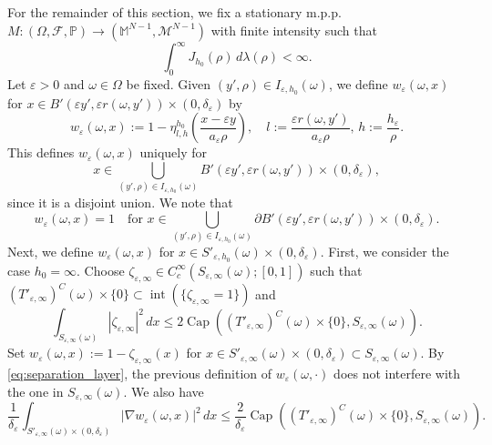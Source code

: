 \documentclass{article}
\numberwithin{equation}{section}
\theoremstyle{definition}
\theoremstyle{remark}
\newcommand{\cpct}{\operatorname{Cap}}
\newcommand{\topint}{\operatorname{int}}
\begin{document}
For the remainder of this section, we fix a stationary m.p.p. $M :(\Omega, \mathcal{F}, \mathbb{P}) \rightarrow (\mathbb{M}^{N - 1}, \mathcal{M}^{N - 1})$ with finite intensity such that
\[
\int_0^\infty J_{h_0}(\rho) \, d\lambda(\rho) < \infty.
\]
Let $\varepsilon > 0$ and $\omega \in \Omega$ be fixed. Given $(y', \rho) \in I_{\varepsilon, h_0}(\omega)$, we define $w_\varepsilon(\omega, x)$ for $x \in B'(\varepsilon y', \varepsilon r(\omega, y')) \times (0, \delta_\varepsilon)$ by
\begin{equation} \label{eq:local_definition}
    w_\varepsilon(\omega, x) := 1 - \eta_{l, h}^{h_0}\left(\frac{x - \varepsilon y}{a_\varepsilon \rho}\right), \quad l := \frac{\varepsilon r(\omega, y')}{a_\varepsilon \rho}, \, h := \frac{h_\varepsilon}{\rho}.
\end{equation}
This defines $w_\varepsilon(\omega, x)$ uniquely for
\[
x \in \bigcup_{(y', \rho) \in I_{\varepsilon, h_0}(\omega)} B'(\varepsilon y', \varepsilon r(\omega, y')) \times (0, \delta_\varepsilon),
\]
since it is a disjoint union. We note that
\begin{equation} \label{eq:lateral_boundary_values_1}
    w_\varepsilon(\omega, x) = 1 \quad \text{for } x \in \bigcup_{(y', \rho) \in I_{\varepsilon, h_0}(\omega)} \partial B'(\varepsilon y', \varepsilon r(\omega, y')) \times (0, \delta_\varepsilon).
\end{equation}
Next, we define $w_\varepsilon(\omega, x)$ for $x \in S'_{\varepsilon, h_0}(\omega) \times (0, \delta_\varepsilon)$. First, we consider the case $h_0 = \infty$. Choose $\zeta_{\varepsilon, \infty} \in C_c^\infty(S_{\varepsilon, \infty}(\omega); [0, 1])$ such that $(T'_{\varepsilon, \infty})^C(\omega) \times \{0\} \subset \topint(\{\zeta_{\varepsilon, \infty} = 1\})$ and
\[
\int_{S_{\varepsilon, \infty}(\omega)} |\zeta_{\varepsilon, \infty}|^2 \, dx \le 2 \cpct\left((T'_{\varepsilon, \infty})^C(\omega) \times \{0\}, S_{\varepsilon, \infty}(\omega)\right).
\]
Set $w_\varepsilon(\omega, x) := 1 - \zeta_{\varepsilon, \infty}(x)$ for $x \in S'_{\varepsilon, \infty}(\omega) \times (0, \delta_{\varepsilon}) \subset S_{\varepsilon, \infty}(\omega)$. By \eqref{eq:separation_layer}, the previous definition of $w_\varepsilon(\omega, \cdot)$ does not interfere with the one in $S_{\varepsilon, \infty}(\omega)$. We also have
\begin{equation} \label{eq:vanishing_gradient_1}
    \frac{1}{\delta_\varepsilon} \int_{S'_{\varepsilon, \infty}(\omega) \times (0, \delta_\varepsilon)} |\nabla w_\varepsilon(\omega, x)|^2 \, dx \le \frac{2}{\delta_\varepsilon} \cpct\left((T'_{\varepsilon, \infty})^C(\omega) \times \{0\}, S_{\varepsilon, \infty}(\omega)\right).
\end{equation}
\end{document}
